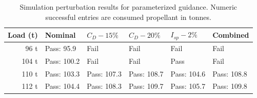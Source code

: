 \begin{table}[htbp]
\caption{Simulation perturbation results for parameterized guidance. Numeric successful entries are consumed propellant in tonnes.}
\label{tab:src16}
\small
\setlength{\tabcolsep}{3.5pt}
\begin{tabularx}{\linewidth}{@{}rXXXXX@{}}
\toprule
Load (t) & Nominal & $C_D-15\%$ & $C_D-20\%$ & $I_{sp}-2\%$ & Combined \\
\midrule
96 t & Pass: 95.9 & Fail & Fail & Fail & Fail \\
104 t & Pass: 100.2 & Fail & Fail & Pass & Fail \\
110 t & Pass: 103.3 & Pass: 107.3 & Pass: 108.7 & Pass: 104.6 & Pass: 108.8 \\
112 t & Pass: 104.4 & Pass: 108.3 & Pass: 109.7 & Pass: 105.7 & Pass: 109.8 \\
\bottomrule
\end{tabularx}
\par{}
\end{table}
